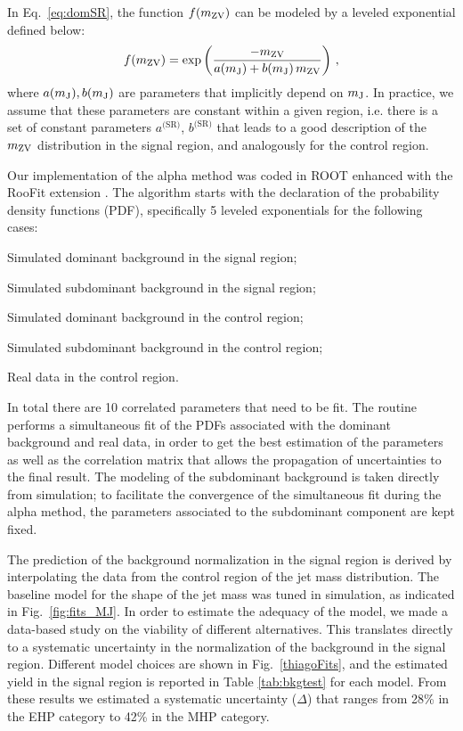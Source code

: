In Eq.~\ref{eq:domSR}, the function $f(m_\mathrm{ZV})$ can be modeled by a leveled exponential defined below:
\begin{equation}
f(m_\mathrm{ZV}) = \exp \left (
\frac{-m_\mathrm{ZV}}
{a(m_\mathrm{J}) + b(m_\mathrm{J})\,m_\mathrm{ZV}}
\right )\,,
\end{equation}
where $a(m_\mathrm{J}), b(m_\mathrm{J})$ are parameters that implicitly depend on $m_\mathrm{J}$. In practice, we assume that these parameters are constant within a given region, i.e. there is a set of constant parameters $a^{\textrm{(SR)}}$, $b^{\textrm{(SR)}}$ that leads to a good description of the $m_\mathrm{ZV}$ distribution in the signal region, and analogously for the control region. 

Our implementation of the alpha method was coded in ROOT \cite{Antcheva:2011zz} enhanced with the RooFit extension \cite{Verkerke:2003ir}. The algorithm starts with the declaration of the probability density functions (PDF), specifically 5 leveled exponentials for the following cases:
\begin{compact_itemize}
\item Simulated dominant background in the signal region;
\item Simulated subdominant background in the signal region;
\item Simulated dominant background in the control region;
\item Simulated subdominant background in the control region;
\item Real data in the control region.
\end{compact_itemize}
In total there are 10 correlated parameters that need to be fit. The routine performs a simultaneous fit of the PDFs associated with the dominant background and real data, in order to get the best estimation of the parameters as well as the correlation matrix that allows the propagation of uncertainties to the final result. The modeling of the subdominant background is taken directly from simulation; to facilitate the convergence of the simultaneous fit during the alpha method, the parameters associated to the subdominant component are kept fixed.

The prediction of the background normalization in the signal region is derived by interpolating the data from the control region of the jet mass distribution. The baseline model for the shape of the jet mass was tuned in simulation, as indicated in Fig.~\ref{fig:fits_MJ}. In order to estimate the adequacy of the model, we made a data-based study on the viability of different alternatives. This translates directly to a systematic uncertainty in the normalization of the background in the signal region. Different model choices are shown in Fig.~\ref{thiagoFits}, and the estimated yield in the signal region is reported in Table \ref{tab:bkgtest} for each model. From these results we estimated a systematic uncertainty ($\Delta$) that ranges from 28\% in the EHP category to 42\% in the MHP category.

